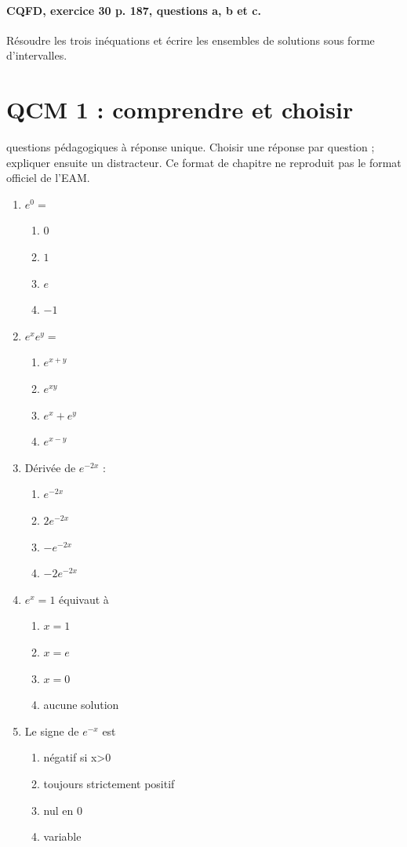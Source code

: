 \paragraph{CQFD, exercice 30 p. 187, questions a, b et c.}\label{C09-M2} Résoudre les trois inéquations et écrire les ensembles de solutions sous forme d’intervalles.
\begingroup\small
\mxnewpage\section*{QCM 1 : comprendre et choisir}\label{C09-Q1}
 questions pédagogiques à réponse unique. Choisir une réponse par question ; expliquer ensuite un distracteur. Ce format de chapitre ne reproduit pas le format officiel de l’EAM.
\begin{enumerate}
\item $e^0=$
\begin{enumerate}[label=\Alph*.,itemsep=2pt]
\item $0$
\item $1$
\item $e$
\item $-1$
\end{enumerate}
\item $e^xe^y=$
\begin{enumerate}[label=\Alph*.,itemsep=2pt]
\item $e^{x+y}$
\item $e^{xy}$
\item $e^x+e^y$
\item $e^{x-y}$
\end{enumerate}
\item Dérivée de $e^{-2x}$ :
\begin{enumerate}[label=\Alph*.,itemsep=2pt]
\item $e^{-2x}$
\item $2e^{-2x}$
\item $-e^{-2x}$
\item $-2e^{-2x}$
\end{enumerate}
\item $e^x=1$ équivaut à
\begin{enumerate}[label=\Alph*.,itemsep=2pt]
\item $x=1$
\item $x=e$
\item $x=0$
\item aucune solution
\end{enumerate}
\item Le signe de $e^{-x}$ est
\begin{enumerate}[label=\Alph*.,itemsep=2pt]
\item négatif si x>0
\item toujours strictement positif
\item nul en 0
\item variable
\end{enumerate}
\end{enumerate}
